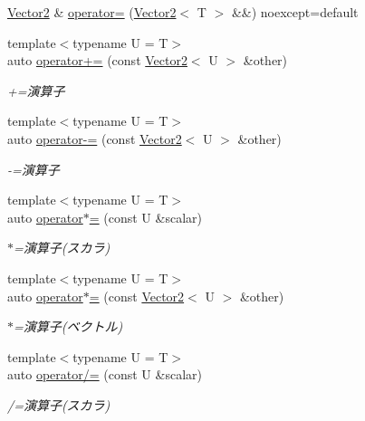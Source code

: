 \begin{DoxyCompactItemize}
\item 
\mbox{\hyperlink{classsaki_1_1_vector2}{Vector2}} \& \mbox{\hyperlink{classsaki_1_1_vector2_a5cc432dc740f218177bd028a5899939f}{operator=}} (\mbox{\hyperlink{classsaki_1_1_vector2}{Vector2}}$<$ T $>$ \&\&) noexcept=default
\item 
{\footnotesize template$<$typename U  = T$>$ }\\auto \mbox{\hyperlink{classsaki_1_1_vector2_aa76ccb2d2228441d510dca7781f785d3}{operator+=}} (const \mbox{\hyperlink{classsaki_1_1_vector2}{Vector2}}$<$ U $>$ \&other)
\begin{DoxyCompactList}\small\item\em +=演算子 \end{DoxyCompactList}\item 
{\footnotesize template$<$typename U  = T$>$ }\\auto \mbox{\hyperlink{classsaki_1_1_vector2_aaf222bfb3a2e02a1570ce2e90c41fdd0}{operator-\/=}} (const \mbox{\hyperlink{classsaki_1_1_vector2}{Vector2}}$<$ U $>$ \&other)
\begin{DoxyCompactList}\small\item\em -\/=演算子 \end{DoxyCompactList}\item 
{\footnotesize template$<$typename U  = T$>$ }\\auto \mbox{\hyperlink{classsaki_1_1_vector2_aab202f42563239dfb59d27295d6c7462}{operator$\ast$=}} (const U \&scalar)
\begin{DoxyCompactList}\small\item\em $\ast$=演算子(スカラ) \end{DoxyCompactList}\item 
{\footnotesize template$<$typename U  = T$>$ }\\auto \mbox{\hyperlink{classsaki_1_1_vector2_a31e1e9e5918b362e2559b453da787fbb}{operator$\ast$=}} (const \mbox{\hyperlink{classsaki_1_1_vector2}{Vector2}}$<$ U $>$ \&other)
\begin{DoxyCompactList}\small\item\em $\ast$=演算子(ベクトル) \end{DoxyCompactList}\item 
{\footnotesize template$<$typename U  = T$>$ }\\auto \mbox{\hyperlink{classsaki_1_1_vector2_a77f6c9bcfeb9f830edf2883069894a30}{operator/=}} (const U \&scalar)
\begin{DoxyCompactList}\small\item\em /=演算子(スカラ) \end{DoxyCompactList}\item 

\end{DoxyCompactItemize}
